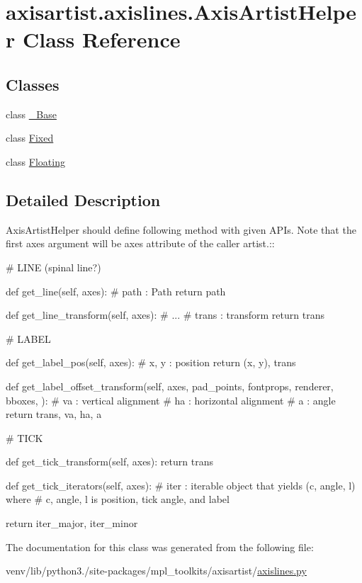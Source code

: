 \hypertarget{classaxisartist_1_1axislines_1_1AxisArtistHelper}{}\section{axisartist.\+axislines.\+Axis\+Artist\+Helper Class Reference}
\label{classaxisartist_1_1axislines_1_1AxisArtistHelper}
\subsection*{Classes}
\begin{DoxyCompactItemize}
\item 
class \hyperlink{classaxisartist_1_1axislines_1_1AxisArtistHelper_1_1__Base}{\+\_\+\+Base}
\item 
class \hyperlink{classaxisartist_1_1axislines_1_1AxisArtistHelper_1_1Fixed}{Fixed}
\item 
class \hyperlink{classaxisartist_1_1axislines_1_1AxisArtistHelper_1_1Floating}{Floating}
\end{DoxyCompactItemize}


\subsection{Detailed Description}
\begin{DoxyVerb}AxisArtistHelper should define
following method with given APIs. Note that the first axes argument
will be axes attribute of the caller artist.::


    # LINE (spinal line?)

    def get_line(self, axes):
        # path : Path
        return path

    def get_line_transform(self, axes):
        # ...
        # trans : transform
        return trans

    # LABEL

    def get_label_pos(self, axes):
        # x, y : position
        return (x, y), trans


    def get_label_offset_transform(self,
            axes,
            pad_points, fontprops, renderer,
            bboxes,
            ):
        # va : vertical alignment
        # ha : horizontal alignment
        # a : angle
        return trans, va, ha, a

    # TICK

    def get_tick_transform(self, axes):
        return trans

    def get_tick_iterators(self, axes):
        # iter : iterable object that yields (c, angle, l) where
        # c, angle, l is position, tick angle, and label

        return iter_major, iter_minor
\end{DoxyVerb}
 

The documentation for this class was generated from the following file\+:\begin{DoxyCompactItemize}
\item 
venv/lib/python3./site-\/packages/mpl\+\_\+toolkits/axisartist/\hyperlink{axisartist_2axislines_8py}{axislines.\+py}\end{DoxyCompactItemize}
